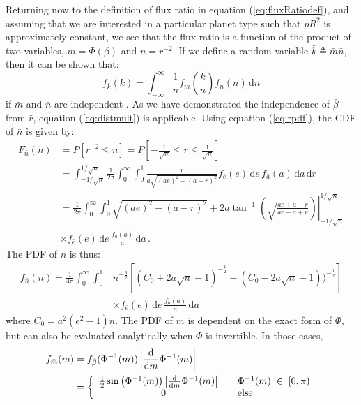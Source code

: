 Returning now to the definition of flux ratio in equation (\ref{eq:fluxRatiodef}), and assuming that we are interested in a particular planet type such that $pR^2$ is approximately constant, we see that the flux ratio is a function of the product of two variables, $m = \Phi(\beta)$ and $n = r^{-2}$.  If we define a random variable $\bar k \triangleq \bar m \bar n$, then it can be shown that:
\begin{equation}\label{eq:distmult}
f_{\bar{k}}(k) = \int_{-\infty}^\infty \frac{1}{n} f_{\bar{m}}\left(\frac{k}{n}\right)f_{\bar{n}}(n)\, \mathrm{d}n
\end{equation}
if $\bar m$ and $\bar n$ are independent \citep{larson}.  As we have demonstrated the independence of $\bar \beta$ from $\bar r$, equation (\ref{eq:distmult}) is applicable.
Using equation (\ref{eq:rpdf}), the CDF of $\bar n$ is given by:
\begin{align}
F_{\bar n}(n) &= P[\bar{r}^{-2} \le n] = P\left[-\frac{1}{\sqrt{n}} \le \bar{r} \le \frac{1}{\sqrt{n}}\right] \nonumber\\
&= \int_{-1/\sqrt{n}}^{1/\sqrt{n}} \frac{1}{2\pi}\int_{0}^{\infty} \int_{0}^{1} \frac{r}{a\sqrt{(ae)^2 - (a-r)^2}}f_{\bar{e}}(e) \, \mathrm{d}e \, f_{\bar{a}}(a)\, \mathrm{d}a \, \mathrm{d}r \\
&= \left. \frac{1}{2\pi}\int_{0}^{\infty} \int_{0}^{1} \sqrt{(ae)^2 - (a-r)^2} + 2 a \tan^{-1}\left(\sqrt{\frac{ae + a - r}{ae - a + r}}\right)\right|_{-1/\sqrt{n}}^{1/\sqrt{n}}\nonumber\\
& \times f_{\bar{e}}(e) \, \mathrm{d}e \, \frac{f_{\bar{a}}(a)}{a}\, \mathrm{d}a \nonumber \,.
\end{align}
The PDF of $n$ is thus:
\begin{align}
f_{\bar n}(n) = \frac{1}{4\pi}\int_{0}^{\infty} \int_{0}^{1}
&n^{-\frac{3}{2}}\left[ \left(C_0 +2a\sqrt{n} - 1\right)^{-\frac{1}{2}} -\left(C_0 - 2a\sqrt{n} - 1\right))^{-\frac{1}{2}}\right] \nonumber\\
& \times f_{\bar{e}}(e) \, \mathrm{d}e \, \frac{f_{\bar{a}}(a)}{a}\, \mathrm{d}a
\end{align}
where $C_0 = a^2(e^2 - 1)n$.  The PDF of $\bar m$ is dependent on the exact form of $\Phi$, but can also be evaluated analytically when $\Phi$ is invertible.  In those cases,
\begin{align}
f_{\bar m}(m) &= f_{\bar \beta}(\Phi^{-1}(m)) \left| \frac{ \mathrm{d}}{ \mathrm{d} m} \Phi^{-1}(m) \right| \label{eq:mpdf}\\
&= 
\left\{
    \begin{array}{c l}
    \frac{1}{2} \sin\left(\Phi^{-1}(m)\right) \left| \frac{ \mathrm{d}}{ \mathrm{d} m} \Phi^{-1}(m) \right|  \quad &  \Phi^{-1}(m) \; \in \; [0, \pi) \\
    0 & \mathrm{else}
    \end{array} \right. \nonumber
\end{align}

